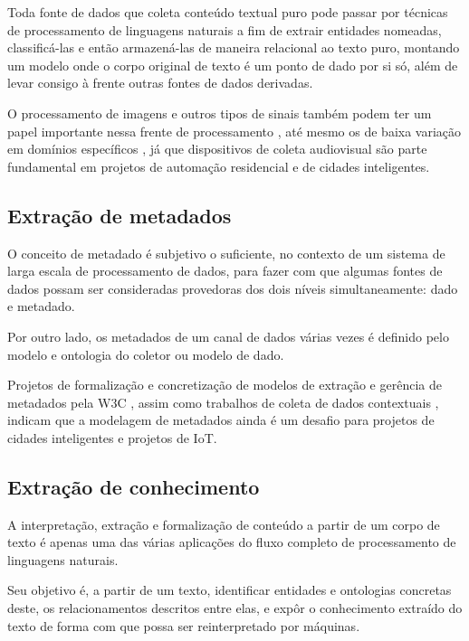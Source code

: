 Toda fonte de dados que coleta conteúdo textual puro pode passar por técnicas de processamento de linguagens naturais a fim de extrair entidades nomeadas, classificá-las e então armazená-las de maneira relacional ao texto puro, montando um modelo onde o corpo original de texto é um ponto de dado por si só, além de levar consigo à frente outras fontes de dados derivadas. 

O processamento de imagens e outros tipos de sinais também podem ter um papel importante nessa frente de processamento \cite{cornel:ner}, até mesmo os de baixa variação em domínios específicos \cite{aalto:ner}, já que dispositivos de coleta audiovisual são parte fundamental em projetos de automação residencial e de cidades inteligentes.

\subsection{Extração de metadados} \label{ss:extracao_de_metadados}

O conceito de metadado é subjetivo o suficiente, no contexto de um sistema de larga escala de processamento de dados, para fazer com que algumas fontes de dados possam ser consideradas provedoras dos dois níveis simultaneamente: dado e metadado.

Por outro lado, os metadados de um canal de dados várias vezes é definido pelo modelo e ontologia do coletor ou modelo de dado. 

Projetos de formalização e concretização de modelos de extração e gerência de metadados pela W3C \cite{w3c:ssn}, assim como trabalhos de coleta de dados contextuais \cite{contextualdata:smartcities}, indicam que a modelagem de metadados ainda é um desafio para projetos de cidades inteligentes e projetos de IoT.

\subsection{Extração de conhecimento} \label{ss:extracao_de_conhecimento}

A interpretação, extração e formalização de conteúdo a partir de um corpo de texto é apenas uma das várias aplicações do fluxo completo de processamento de linguagens naturais.

Seu objetivo é, a partir de um texto, identificar entidades e ontologias concretas deste, os relacionamentos descritos entre elas, e expôr o conhecimento extraído do texto de forma com que possa ser reinterpretado por máquinas.